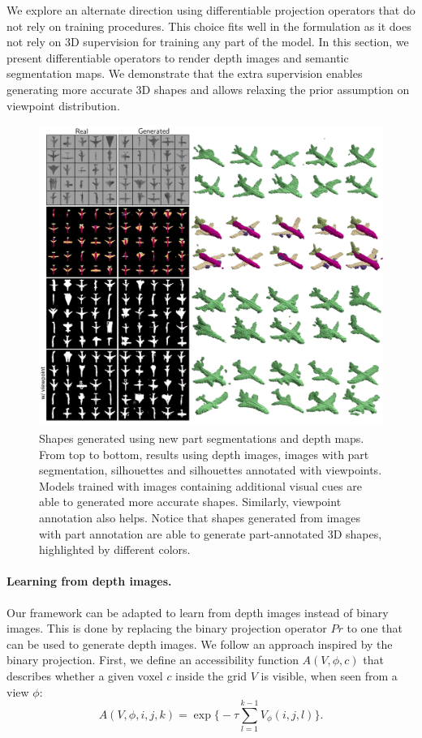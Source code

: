 We explore an alternate direction using differentiable projection
operators that do not rely on training procedures.
This choice fits well in the \prgan formulation as it does not
rely on 3D supervision for training any part of the model.
In this section, we present differentiable operators to render
depth images and semantic segmentation maps.
We demonstrate that the extra supervision enables generating more
accurate 3D shapes and allows relaxing the prior assumption
on viewpoint distribution.

\begin{figure}[t]
\centering
\includegraphics[width=\linewidth]{fig/new/newprojs.pdf}
\caption{\label{fig:newprojs} Shapes generated using new part segmentations and depth maps.
	From top to bottom, results using depth images, images with part segmentation, silhouettes and silhouettes annotated with viewpoints.
	Models trained with images containing additional visual cues are able to generated more accurate shapes. 
	Similarly, viewpoint annotation also helps.
	Notice that shapes generated from images with part annotation are able to generate part-annotated 3D shapes, highlighted by different colors.}
\end{figure}

\paragraph{Learning from depth images.}
Our framework can be adapted to learn from depth images instead of binary images.
This is done by replacing the binary projection operator $Pr$ to one that can be used to generate
depth images.
We follow an approach inspired by the binary projection.
First, we define an accessibility function $A(V, \phi, c)$ that describes whether a given voxel $c$ inside the grid $V$ is visible, 
when seen from a view $\phi$:
\begin{equation}
A(V, \phi, i, j, k) = \exp\bigg\{-\tau \sum_{l=1}^{k-1} V_\phi(i,j,l) \bigg\}.
\end{equation}

